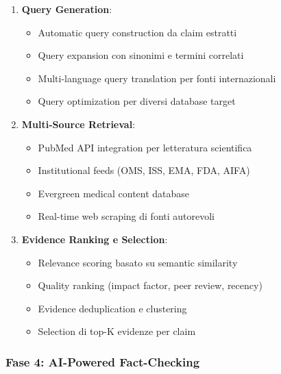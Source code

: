 \documentclass[12pt,a4paper]{report}
\begin{document}
\begin{enumerate}
    \item \textbf{Query Generation}:
    \begin{itemize}
        \item Automatic query construction da claim estratti
        \item Query expansion con sinonimi e termini correlati
        \item Multi-language query translation per fonti internazionali
        \item Query optimization per diversi database target
    \end{itemize}
    
    \item \textbf{Multi-Source Retrieval}:
    \begin{itemize}
        \item PubMed API integration per letteratura scientifica
        \item Institutional feeds (OMS, ISS, EMA, FDA, AIFA)
        \item Evergreen medical content database
        \item Real-time web scraping di fonti autorevoli
    \end{itemize}
    
    \item \textbf{Evidence Ranking e Selection}:
    \begin{itemize}
        \item Relevance scoring basato su semantic similarity
        \item Quality ranking (impact factor, peer review, recency)
        \item Evidence deduplication e clustering
        \item Selection di top-K evidenze per claim
    \end{itemize}
\end{enumerate}

\subsubsection{Fase 4: AI-Powered Fact-Checking}
\end{document}
